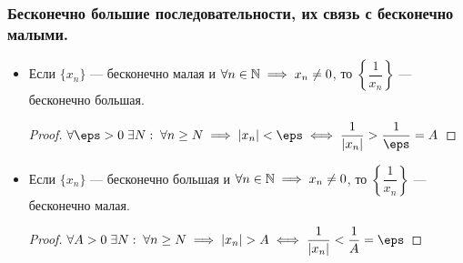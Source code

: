 \documentclass[12pt, a4paper]{article}
\begin{document}
	\subsubsection{Бесконечно большие последовательности, их связь с бесконечно малыми.}
	\begin{itemize}
		\item
		Если $\{x_n\}$ --- бесконечно малая и $\forall n \in \mathbb{N} \implies x_n \neq 0$, то $\left\{\dfrac{1}{x_n}\right\}$ --- бесконечно большая.
		\begin{proof}
			$\forall \eps > 0 \; \exists N: \; \forall n \geq N \implies |x_n| < \eps \iff \dfrac{1}{|x_n|} > \dfrac{1}{\eps} = A$
		\end{proof}

		\item
		Если $\{x_n\}$ --- бесконечно большая и $\forall n \in \mathbb{N} \implies x_n \neq 0$, то $\left\{\dfrac{1}{x_n}\right\}$ --- бесконечно малая.
		\begin{proof}
			$\forall A > 0 \; \exists N: \; \forall n \geq N \implies |x_n| > A \iff \dfrac{1}{|x_n|} < \dfrac{1}{A} = \eps$
		\end{proof}
	\end{itemize}
\end{document}
